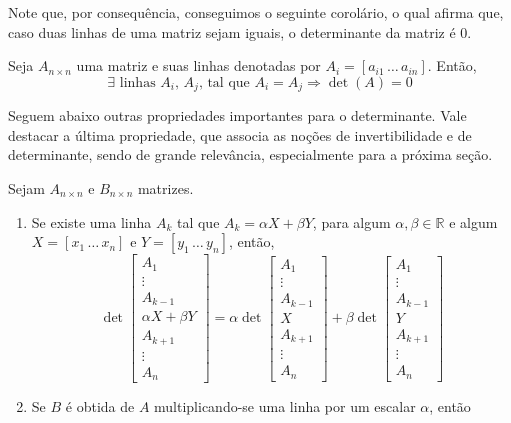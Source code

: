 \documentclass[../main.tex]{subfiles}
\begin{document}
			Note que, por consequência, conseguimos o seguinte corolário, o qual afirma que, caso duas linhas de uma matriz sejam iguais, o determinante da matriz é $0$.
			\begin{corolario}
				Seja $A_{n\times n}$ uma matriz e suas linhas denotadas por $A_i=[a_{i1}\,\dots\, a_{in}]$. Então,
				\[
				\exists \text{ linhas } A_i,\, A_j \text{, tal que } A_i=A_j\Rightarrow 	\det(A)=0
				\]
			\end{corolario}
			Seguem abaixo outras propriedades importantes para o determinante. Vale destacar a última propriedade, que associa as noções de invertibilidade e de determinante, sendo de grande relevância, especialmente para a próxima seção.
			\begin{teorema}
				Sejam $A_{n\times n}$ e $B_{n\times n}$ matrizes.
				\begin{enumerate}[label=\roman*)]
					\item Se existe uma linha $A_k$ tal que $A_k=\alpha X+\beta Y$, para algum $\alpha, \beta \in \mathbb{R}$ e algum $X=[x_1\, \dots\, x_n]$ e $Y=[y_1\,\dots\, y_n]$, então, 
					\[
					\det \begin{bmatrix}
						A_1 \\
						\vdots \\
						A_{k-1}\\
						\alpha X+\beta Y\\
						A_{k+1}\\
						\vdots\\
						A_n
					\end{bmatrix} = \alpha \det \begin{bmatrix}
						A_1 \\
						\vdots \\
						A_{k-1}\\
						X\\
						A_{k+1}\\
						\vdots\\
						A_n
					\end{bmatrix} + \beta \det \begin{bmatrix}
						A_1 \\
						\vdots \\
						A_{k-1}\\
						Y\\
						A_{k+1}\\
						\vdots\\
						A_n
					\end{bmatrix}
					\]
					\item Se $B$ é obtida de $A$ multiplicando-se uma linha por um escalar $\alpha$, então

\end{enumerate}
\end{teorema}
\end{document}
